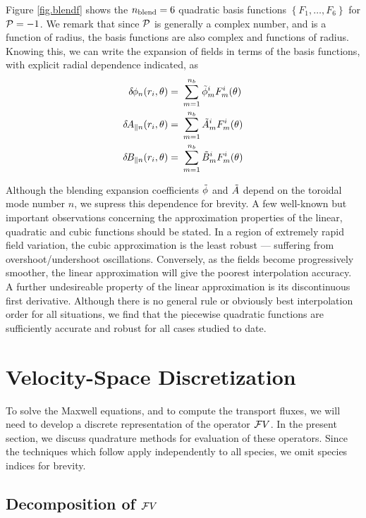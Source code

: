 Figure \ref{fig.blendf} shows the ${n_{\rm blend}} = 6$ quadratic basis 
functions $\left\{F_1, \ldots, F_6\right\}$ for ${\cal P} = -1$.  
We remark that since ${\cal P}$ is generally a complex number, 
and is a function of radius, the basis functions are also 
complex and functions of radius.  Knowing this, we can 
write the expansion of fields in terms of the basis 
functions, with explicit radial dependence indicated, as
%
\begin{align}
\delta \hskip -1pt \phi_n(r_i,\theta) = &~\sum_{m=1}^{n_b} {\tilde{\phi}}_m^i F_m^i(\theta) \\
\delta \hskip -1pt A_{\parallel n}(r_i,\theta)  = &~\sum_{m=1}^{n_b} {\tilde{A}}_m^i F_m^i(\theta) \\
\delta \hskip -1pt B_{\parallel n}(r_i,\theta)  = &~\sum_{m=1}^{n_b} {\tilde{B}}_m^i F_m^i(\theta) 
\end{align}

Although the blending expansion coefficients $\tilde{\phi}$ and $\tilde{A}$ 
depend on the toroidal mode number $n$, we supress this 
dependence for brevity. 
A few well-known but important observations concerning the 
approximation properties of the linear, quadratic and cubic 
functions should be stated.  In a region of extremely rapid field 
variation, the cubic approximation is the least robust --- suffering 
from overshoot/undershoot oscillations.  Conversely, as the fields 
become progressively smoother, the linear approximation will give 
the poorest interpolation accuracy.  A further undesireable 
property of the linear approximation is its discontinuous first 
derivative.  Although there is no general rule or obviously best 
interpolation order for all situations, we find that the piecewise 
quadratic functions are sufficiently accurate and robust for all 
cases studied to date.

\section{Velocity-Space Discretization}

To solve the Maxwell equations, and to compute the 
transport fluxes, we will need to develop a discrete 
representation of the operator ${\cal F}V$.  In the 
present section, we discuss quadrature methods for evaluation 
of these operators.  Since the techniques which follow apply 
independently to all species, we omit species indices for 
brevity.

\subsection{Decomposition of ${\cal F}V$}

